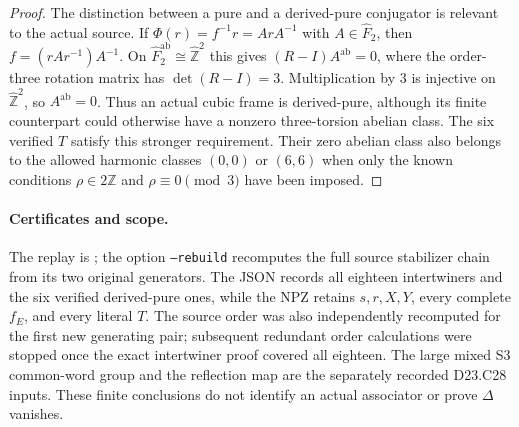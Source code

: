 \begin{proof}
The distinction between a pure and a derived-pure
conjugator is relevant to the actual source. If
$\Phi(r)=f^{-1}r=ArA^{-1}$ with $A\in\widehat F_2$,
then $f=(rAr^{-1})A^{-1}$. On
$\widehat F_2^{\mathrm{ab}}\cong\widehat{\mathbb Z}^2$
this gives $(R-I)A^{\mathrm{ab}}=0$, where the order-three
rotation matrix has $\det(R-I)=3$. Multiplication by
$3$ is injective on $\widehat{\mathbb Z}^2$, so
$A^{\mathrm{ab}}=0$. Thus an actual cubic frame is
derived-pure, although its finite counterpart could
otherwise have a nonzero three-torsion abelian class.
The six verified $T$ satisfy this stronger requirement.
Their zero abelian class also belongs to the allowed
harmonic classes $(0,0)$ or $(6,6)$ when only the known
conditions $\rho\in2\widehat{\mathbb Z}$ and
$\rho\equiv0\pmod3$ have been imposed.
\end{proof}

\paragraph{Certificates and scope.}
The replay is
;
the option \texttt{--rebuild} recomputes the full source
stabilizer chain from its two original generators.
The JSON records all eighteen intertwiners and the six
verified derived-pure ones, while the NPZ retains $s,r,X,Y$,
every complete $f_E$, and every literal $T$.
The source order was also independently recomputed for
the first new generating pair; subsequent redundant
order calculations were stopped once the exact
intertwiner proof covered all eighteen.
The large mixed S3 common-word group and the reflection
map are the separately recorded D23.C28 inputs. These
finite conclusions do not identify an actual associator
or prove $\Delta$ vanishes.
